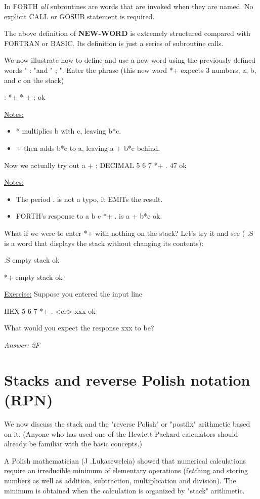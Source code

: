 In FORTH \textit{all} subroutines are words that are invoked when they are named. No explicit CALL or GOSUB statement is required.

The above definition of \textbf{NEW-WORD} is extremely structured compared with FORTRAN or BASIC. Its definition is just a series of subroutine calls.

We now illustrate how to define and use a new word using the previously defined words " : "and " ; ". Enter the phrase (this new word *+ expects 3 numbers, a, b, and c on the stack)

: *+ 	* + ; ok

\underline{Notes:}
\begin{itemize}
	\item * multiplies b with c, leaving b*c.
	\item + then adds b*c to a, leaving a + b*c behind.
\end{itemize}

Now we actually try out a + :
DECIMAL 5 6 7 *+ . 47 ok

\underline{Notes:}
\begin{itemize}
	\item The period . is not a typo, it EMlTs the result.
	\item FORTH’s response to a b c *+ . is a + b*c ok.
\end{itemize}

What if we were to enter *+ with nothing on the stack? Let's try it and see ( .S is a word that displays the stack without changing its contents):

.S empty stack ok

*+ empty stack ok

\underline{Exercise:}
Suppose you entered the input line

HEX 5 6 7 *+ . <cr> xxx ok

What would you expect the response xxx to be?

\textit{Answer: 2F}

\section{Stacks and reverse Polish notation (RPN)}

We now discuss the stack and the "reverse Polish" or "postfix" arithmetic based on it. (Anyone who has used one of the Hewlett-Packard calculators should already be familiar with the basic concepts.)

A Polish mathematician (J .Lukasewcleia) showed that numerical calculations require an irreducible minimum of elementary operations (f\textit{etc}hing and storing numbers as well as addition, subtraction, multiplication and division). The minimum is obtained when the calculation is organized by "stack" arithmetic.

